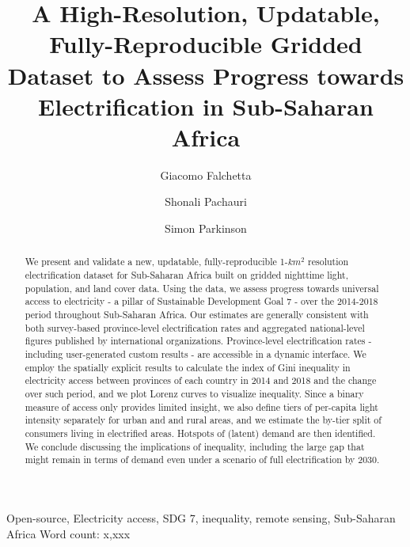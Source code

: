 \documentclass[preprint,12pt]{elsarticle}
\begin{document}
\begin{frontmatter}

\title{A High-Resolution, Updatable, Fully-Reproducible Gridded Dataset to Assess Progress towards Electrification in Sub-Saharan Africa}

\author[uno,due]{Giacomo Falchetta}

\author[due]{Shonali Pachauri}
\author[due]{Simon Parkinson}



\address[uno]{Fondazione Eni Enrico Mattei (FEEM), Corso Magenta 63, 2013 , Milan, Italy}
\address[due]{International Institute for Applied Systems Analysis, Schossplatz 1, Laxenburg, Austria}

\begin{abstract}
We present and validate a new, updatable, fully-reproducible 1-$km^2$ resolution electrification dataset for Sub-Saharan Africa built on gridded nighttime light, population, and land cover data. Using the data, we assess progress towards universal access to electricity - a pillar of Sustainable Development Goal 7 - over the 2014-2018 period throughout Sub-Saharan Africa. Our estimates are generally consistent with both survey-based province-level electrification rates and aggregated national-level figures published by international organizations. Province-level electrification rates - including user-generated custom results - are accessible in a dynamic interface. We employ the spatially explicit results to calculate the index of Gini inequality in electricity access between provinces of each country in 2014 and 2018 and the change over such period, and we plot Lorenz curves to visualize inequality. Since a binary measure of access only provides limited insight, we also  define tiers of per-capita light intensity separately for urban and and rural areas, and we estimate the by-tier split of consumers living in electrified areas. Hotspots of (latent) demand are then identified. We conclude discussing the implications of inequality, including the large gap that might remain in terms of demand even under a scenario of full electrification by 2030. 
\end{abstract}


\begin{keyword}
Open-source, Electricity access, SDG 7, inequality, remote sensing, Sub-Saharan Africa \newline
Word count: x,xxx 
\end{keyword}
\end{frontmatter}
\linenumbers
\end{document}
